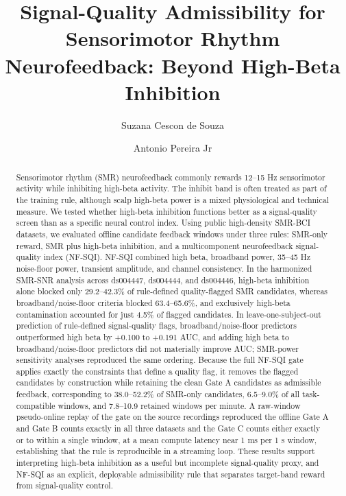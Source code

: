\documentclass[preprint,12pt]{elsarticle}
\begin{document}
\begin{frontmatter}

\title{Signal-Quality Admissibility for Sensorimotor Rhythm Neurofeedback: Beyond High-Beta Inhibition}

\author[1]{Suzana Cescon de Souza}
\author[1]{\texorpdfstring{Antonio Pereira Jr}{Antonio Pereira}}


\begin{abstract}
Sensorimotor rhythm (SMR) neurofeedback commonly rewards 12--15 Hz sensorimotor activity while inhibiting high-beta activity. The inhibit band is often treated as part of the training rule, although scalp high-beta power is a mixed physiological and technical measure. We tested whether high-beta inhibition functions better as a signal-quality screen than as a specific neural control index. Using public high-density SMR-BCI datasets, we evaluated offline candidate feedback windows under three rules: SMR-only reward, SMR plus high-beta inhibition, and a multicomponent neurofeedback signal-quality index (NF-SQI). NF-SQI combined high beta, broadband power, 35--45 Hz noise-floor power, transient amplitude, and channel consistency. In the harmonized SMR-SNR analysis across ds004447, ds004444, and ds004446, high-beta inhibition alone blocked only 29.2--42.3\% of rule-defined quality-flagged SMR candidates, whereas broadband/noise-floor criteria blocked 63.4--65.6\%, and exclusively high-beta contamination accounted for just 4.5\% of flagged candidates. In leave-one-subject-out prediction of rule-defined signal-quality flags, broadband/noise-floor predictors outperformed high beta by +0.100 to +0.191 AUC, and adding high beta to broadband/noise-floor predictors did not materially improve AUC; SMR-power sensitivity analyses reproduced the same ordering. Because the full NF-SQI gate applies exactly the constraints that define a quality flag, it removes the flagged candidates by construction while retaining the clean Gate A candidates as admissible feedback, corresponding to 38.0--52.2\% of SMR-only candidates, 6.5--9.0\% of all task-compatible windows, and 7.8--10.9 retained windows per minute. A raw-window pseudo-online replay of the gate on the source recordings reproduced the offline Gate A and Gate B counts exactly in all three datasets and the Gate C counts either exactly or to within a single window, at a mean compute latency near 1 ms per 1 s window, establishing that the rule is reproducible in a streaming loop. These results support interpreting high-beta inhibition as a useful but incomplete signal-quality proxy, and NF-SQI as an explicit, deployable admissibility rule that separates target-band reward from signal-quality control.
\end{abstract}


\end{frontmatter}
\end{document}
